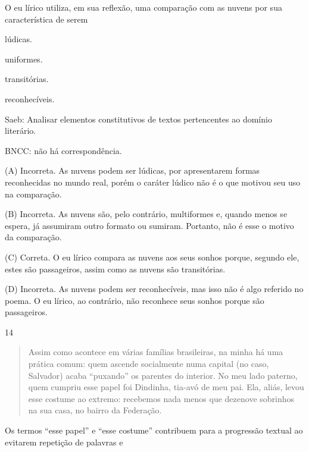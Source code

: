 
O eu lírico utiliza, em sua reflexão, uma comparação com as nuvens por
sua característica de serem

\begin{escolha}
\item lúdicas.

\item uniformes.

\item transitórias.

\item reconhecíveis.
\end{escolha}

Saeb: Analisar elementos constitutivos de textos pertencentes ao domínio
literário.

BNCC: não há correspondência.

(A) Incorreta. As nuvens podem ser lúdicas, por apresentarem formas
reconhecidas no mundo real, porém o caráter lúdico não é o que motivou
seu uso na comparação.

(B) Incorreta. As nuvens são, pelo contrário, multiformes e, quando
menos se espera, já assumiram outro formato ou sumiram. Portanto, não é
esse o motivo da comparação.

(C) Correta. O eu lírico compara as nuvens aos seus sonhos porque,
segundo ele, estes são passageiros, assim como as nuvens são
transitórias.

(D) Incorreta. As nuvens podem ser reconhecíveis, mas isso não é algo
referido no poema. O eu lírico, ao contrário, não reconhece seus sonhos
porque são passageiros.

\num{14}

\begin{quote}
Assim como acontece em várias famílias brasileiras, na minha há uma
prática comum: quem ascende socialmente numa capital (no caso, Salvador)
acaba ``puxando'' os parentes do interior. No meu lado paterno, quem
cumpriu esse papel foi Dindinha, tia-avó de meu pai. Ela, aliás, levou
esse costume ao extremo: recebemos nada menos que dezenove sobrinhos na
sua casa, no bairro da Federação.
\end{quote}


Os termos ``esse papel'' e ``esse costume'' contribuem para a progressão
textual ao evitarem repetição de palavras e

